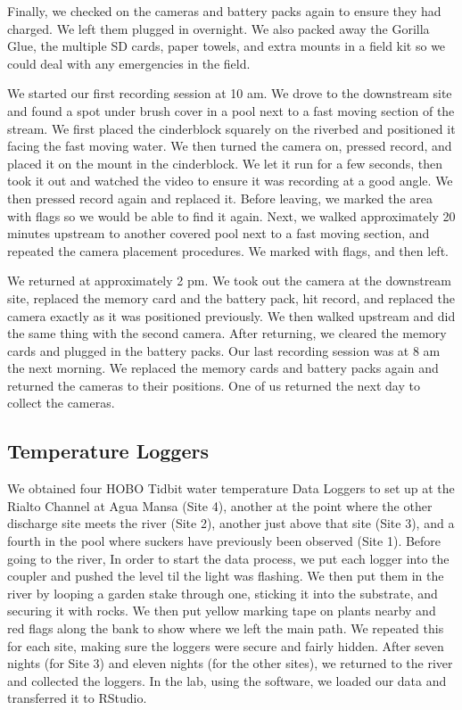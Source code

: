 \documentclass{article}\usepackage[]{graphicx}\usepackage[]{color}
\begin{document}
Finally, we checked on the cameras and battery packs again to ensure they had charged. We left them plugged in overnight. We also packed away the Gorilla Glue, the multiple SD cards, paper towels, and extra mounts in a field kit so we could deal with any emergencies in the field.

We started our first recording session at 10 am.  We drove to the downstream site and found a spot under brush cover in a pool next to a fast moving section of the stream.  We first placed the cinderblock squarely on the riverbed and positioned it facing the fast moving water.  We then turned the camera on, pressed record, and placed it on the mount in the cinderblock.  We let it run for a few seconds, then took it out and watched the video to ensure it was recording at a good angle.  We then pressed record again and replaced it.  Before leaving, we marked the area with flags so we would be able to find it again.
Next, we walked approximately 20 minutes upstream to another covered pool next to a fast moving section, and repeated the camera placement procedures.  We marked with flags, and then left.

We returned at approximately 2 pm.  We took out the camera at the downstream site, replaced the memory card and the battery pack, hit record, and replaced the camera exactly as it was positioned previously.  We then walked upstream and did the same thing with the second camera.  After returning, we cleared the memory cards and plugged in the battery packs.
Our last recording session was at 8 am the next morning.  We replaced the memory cards and battery packs again and returned the cameras to their positions.  One of us returned the next day to collect the cameras.

\subsection{Temperature Loggers}
We obtained four HOBO Tidbit water temperature Data Loggers to set up at the Rialto Channel at Agua Mansa (Site 4), another at the point where the other discharge site meets the river (Site 2), another just above that site (Site 3), and a fourth in the pool where suckers have previously been observed (Site 1). Before going to the river, In order to start the data process, we put each logger into the coupler and pushed the level til the light was flashing. We then put them in the river by looping a garden stake through one, sticking it into the substrate, and securing it with rocks. We then put yellow marking tape on plants nearby and red flags along the bank to show where we left the main path. We repeated this for each site, making sure the loggers were secure and fairly hidden. After seven nights (for Site 3) and eleven nights (for the other sites), we returned to the river and collected the loggers. In the lab, using the software, we loaded our data and transferred it to RStudio.
\end{document}
